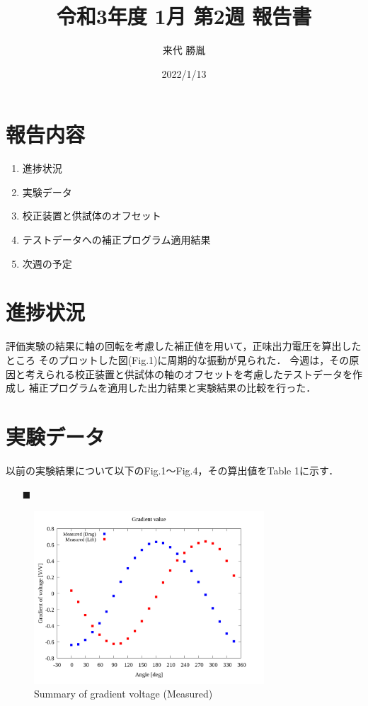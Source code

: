 \documentclass[twocolumn,a4j]{jsarticle}
\author{来代 勝胤}
\title{令和3年度 1月 第2週 報告書}
\date{2022/1/13}
\begin{document}
\columnseprule=0.1mm

\maketitle
\section*{報告内容}
\begin{enumerate}[1.]
    \item 進捗状況
    \item 実験データ
    \item 校正装置と供試体のオフセット
    \item テストデータへの補正プログラム適用結果
    \item 次週の予定
\end{enumerate}

\section{進捗状況}
評価実験の結果に軸の回転を考慮した補正値を用いて，正味出力電圧を算出したところ
そのプロットした図(Fig.1)に周期的な振動が見られた．
今週は，その原因と考えられる校正装置と供試体の軸のオフセットを考慮したテストデータを作成し
補正プログラムを適用した出力結果と実験結果の比較を行った．

\section{実験データ}
以前の実験結果について以下のFig.1～Fig.4，その算出値をTable 1に示す．

\begin{itemize}
    \item [$\blacksquare$] 
\end{itemize}

\begin{figure}[htbp]
    \footnotesize
    \begin{center}
        \includegraphics[width=86mm]{../graphes/1-ex/05/05_summary-wave.png}
        \caption{Summary of gradient voltage (Measured)}
    \end{center}
\end{figure}
\end{document}

